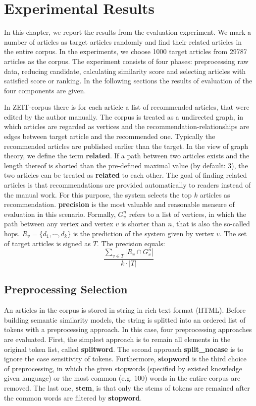 
\section{Experimental Results}
\label{sec:5}

In this chapter, we report the results from the evaluation experiment. We mark a number of articles as target articles randomly and find their related articles in the entire corpus. In the experiments, we choose 1000 target articles from 29787 articles as the corpus. The experiment consists of four phases: preprocessing raw data, reducing candidate, calculating similarity score and selecting articles with satisfied score or ranking. In the following sections the results of evaluation of the four components are given. 

In ZEIT-corpus there is for each article a list of recommended articles, that were edited by the author manually. The corpus is treated as a undirected graph, in which articles are regarded as vertices and the recommendation-relationships are edges between target article and the recommended one. Typically the recommended articles are published earlier than the target. In the view of graph theory, we define the term \textbf{related}. If a path between two articles exists and the length thereof is shorted than the pre-defined maximal value (by default: 3), the two articles can be treated as \textbf{related} to each other. The goal of finding related articles is that recommendations are provided automatically to readers instead of the manual work. For this purpose, the system selects the top $k$ articles as recommendation. \textbf{precision} is the most valuable and reasonable measure of evaluation in this scenario. Formally, $G_v^n$ refers to a list of vertices, in which the path between any vertex and vertex $v$ is shorter than $n$, that is also the so-called hops. $R_v=\{d_1, \cdots, d_k\}$ is the prediction of the system given by vertex $v$. The set of target articles is signed as $T$. The precision equals:
$$\frac{\sum_{v\in T}|R_v \cap G_v^n|}{k \cdot |T|}$$


\subsection{Preprocessing Selection}

An articles in the corpus is stored in string in rich text format (HTML). Before building semantic similarity models, the string is splitted into an ordered list of tokens with a preprocessing approach. In this case, four preprocessing approaches are evaluated. First, the simplest approach is to remain all elements in the original token list, called \textbf{splitword}. The second approach \textbf{split\_nocase} is to ignore the case sensitivity of tokens. Furthermore, \textbf{stopword} is the third choice of preprocessing, in which the given stopwords (specified by existed knowledge given language) or the most common (e.g. 100) words in the entire corpus are removed. The last one, \textbf{stem}, is that only the stems of tokens are remained after the common words are filtered by \textbf{stopword}. 

